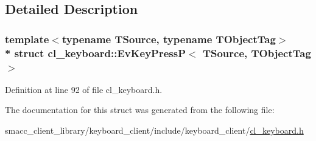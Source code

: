 \subsection{Detailed Description}
\subsubsection*{template$<$typename T\+Source, typename T\+Object\+Tag$>$\\*
struct cl\+\_\+keyboard\+::\+Ev\+Key\+Press\+P$<$ T\+Source, T\+Object\+Tag $>$}



Definition at line 92 of file cl\+\_\+keyboard.\+h.



The documentation for this struct was generated from the following file\+:\begin{DoxyCompactItemize}
\item 
smacc\+\_\+client\+\_\+library/keyboard\+\_\+client/include/keyboard\+\_\+client/\hyperlink{cl__keyboard_8h}{cl\+\_\+keyboard.\+h}\end{DoxyCompactItemize}
